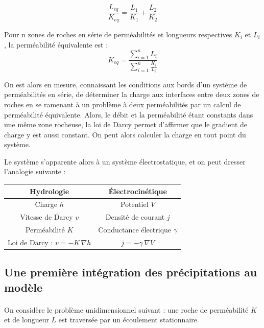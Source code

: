 \documentclass{article}
\begin{document}
$$ \dfrac{L_{eq}}{K_{eq}} = \dfrac{L_1}{K_1} + \dfrac{L_2}{K_2} $$

Pour n zones de roches en série de perméabilités et longueurs respectives $K_{i}$ et $L_{i}$, la perméabilité équivalente est :
$$K_{eq} = \frac{\sum\limits_{i=1}^{n}L_i}{\sum\limits_{i=1}^{n}\frac{K_i}{L_i}} $$

On est alors en mesure, connaissant les conditions aux bords d’un système de perméabilités en série, de déterminer la charge aux interfaces entre deux zones de roches en se ramenant à un problème à deux perméabilités par un calcul de perméabilité équivalente. Alors, le débit et la perméabilité étant constants dans une même zone rocheuse, la loi de Darcy permet d’affirmer que le gradient de charge y est aussi constant. On peut alors calculer la charge en tout point du système.

Le système s’apparente alors à un système électrostatique, et on peut dresser l’analogie suivante :

\begin{center}
\begin{tabular}{ |c |c |}
\hline
 \textbf{Hydrologie} & \textbf{Électrocinétique} \\ 
 \hline
 Charge $h$ & Potentiel $V$ \\ 
 \hline
 Vitesse de Darcy $v$ & Densité de courant $j$  \\
 \hline
Perméabilité $K$ & Conductance électrique $\gamma$  \\
 \hline
Loi de Darcy : $v = -K\,\nabla h$ & $j = -\gamma\,\nabla V$  \\
 \hline
\end{tabular}
\end{center}

\subsection{Une première intégration des précipitations au modèle}
\paragraph{} On considère le problème unidimensionnel suivant : une roche de perméabilité $K$ et de longueur $L$ est traversée par un écoulement stationnaire.
\end{document}
